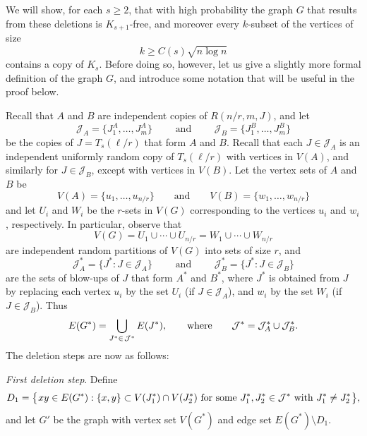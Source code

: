 \documentclass[12pt,reqno]{amsart}
\theoremstyle{remark}
\numberwithin{theorem}{section}
\renewcommand{\(}{\bigl(}
\renewcommand{\)}{\bigr)\vphantom{)}}
\newcommand{\cJ}{\mathcal J}
\renewcommand{\ge}{\geqslant}
\begin{document}
\pagebreak

We will show, for each $s \ge 2$, that with high probability the graph $G$ that results from these deletions is $K_{s+1}$-free, and moreover every $k$-subset of the vertices of size 
$$k \ge C(s)\sqrt{n\log n}$$
contains a copy of $K_s$. Before doing so, however, let us give a slightly more formal definition of the graph $G$, and introduce some notation that will be useful in the proof below. 

Recall that $A$ and $B$ are independent copies of $R(n/r,m,J)$, and let
\begin{equation}\label{def:JA:JB}
\cJ_A = \big\{ J_1^A,\ldots, J_m^A \big\} \qquad \text{ and } \qquad \cJ_B = \big\{ J_1^B,\ldots, J_m^B \big\}
\end{equation}
be the copies of $J = T_s(\ell/r)$ that form $A$ and $B$. Recall that each $J \in \cJ_A$ is an independent uniformly random copy of $T_s(\ell/r)$ with vertices in $V(A)$, and similarly for $J \in \cJ_B$, except with vertices in $V(B)$. Let the vertex sets of $A$ and $B$ be
$$V(A) = \{ u_1,\ldots,u_{n/r} \} \qquad \text{and} \qquad V(B) = \{ w_1,\ldots,w_{n/r} \}$$
and %
let $U_i$ and $W_i$ be the $r$-sets in $V(G)$ corresponding to the vertices $u_i$ and $w_i$, respectively. In particular, observe that
\begin{equation}\label{def:partitions}
V(G) = U_1 \cup \cdots \cup U_{n/r} = W_1 \cup \cdots \cup W_{n/r}
\end{equation}
are independent random partitions of $V(G)$ into sets of size $r$, and 
$$\cJ^*_A = \big\{ J^* : J \in \cJ_A \big\} \qquad \text{ and } \qquad \cJ^*_B = \big\{ J^* : J \in \cJ_B \big\}$$
are the sets of blow-ups of $J$ that form $A^*$ and $B^*$, where $J^*$ is obtained from $J$ by replacing each vertex $u_i$ by the set $U_i$ (if $J \in \cJ_A$), and $w_i$ by the set $W_i$ (if $J \in \cJ_B$). Thus
\begin{equation}\label{def:Gstar}
E(G^*) = \bigcup_{J^* \in \hspace{0.03cm} \cJ^*} E(J^*), \qquad \text{where} \qquad \cJ^* = \cJ^*_A \cup \cJ^*_B.
\end{equation}
The deletion steps are now as follows:\smallskip

\noindent \emph{First deletion step}. Define
\begin{equation}\label{def:D1}
D_1 = \big\{ \hspace{0.02cm} xy \in E(G^*) : \{x,y\} \subset V(J_1^*) \cap V(J_2^*) \text{ for some } J_1^*,J_2^* \in \cJ^* \text{ with } J_1^* \ne J_2^* \hspace{0.02cm} \big\},
\end{equation}
and let $G'$ be the graph with vertex set $V(G^*)$ and edge set $E(G^*) \setminus D_1$.\smallskip 
\end{document}
